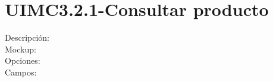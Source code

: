 
\section{UIMC3.2.1-Consultar producto}
\begin{description}
	\item[Descripción:]
	
	\item[Mockup:]\hspace{1pt}
	
	\item[Opciones:]
	
	\item[Campos:]

\end{description}
